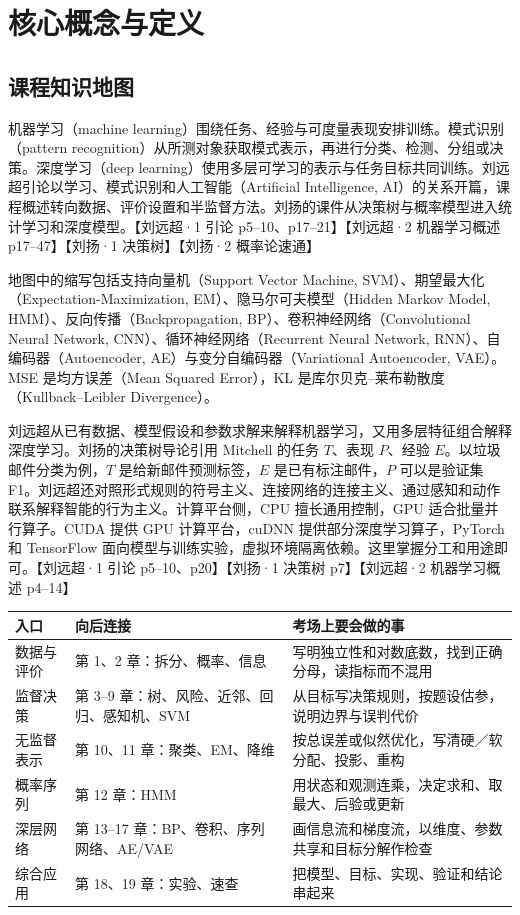 \documentclass[UTF8,a4paper,zihao=-4,fontset=fandol]{ctexrep}
\begin{document}
\section{核心概念与定义}
\subsection{课程知识地图}
机器学习（machine learning）围绕任务、经验与可度量表现安排训练。模式识别（pattern recognition）从所测对象获取模式表示，再进行分类、检测、分组或决策。深度学习（deep learning）使用多层可学习的表示与任务目标共同训练。刘远超引论以学习、模式识别和人工智能（Artificial Intelligence, AI）的关系开篇，课程概述转向数据、评价设置和半监督方法。刘扬的课件从决策树与概率模型进入统计学习和深度模型。【刘远超·1 引论 p5–10、p17–21】【刘远超·2 机器学习概述 p17–47】【刘扬·1 决策树】【刘扬·2 概率论速通】

地图中的缩写包括支持向量机（Support Vector Machine, SVM）、期望最大化（Expectation-Maximization, EM）、隐马尔可夫模型（Hidden Markov Model, HMM）、反向传播（Backpropagation, BP）、卷积神经网络（Convolutional Neural Network, CNN）、循环神经网络（Recurrent Neural Network, RNN）、自编码器（Autoencoder, AE）与变分自编码器（Variational Autoencoder, VAE）。MSE 是均方误差（Mean Squared Error），KL 是库尔贝克–莱布勒散度（Kullback–Leibler Divergence）。

刘远超从已有数据、模型假设和参数求解来解释机器学习，又用多层特征组合解释深度学习。刘扬的决策树导论引用 Mitchell 的任务 $T$、表现 $P$、经验 $E$。以垃圾邮件分类为例，$T$ 是给新邮件预测标签，$E$ 是已有标注邮件，$P$ 可以是验证集 F1。刘远超还对照形式规则的符号主义、连接网络的连接主义、通过感知和动作联系解释智能的行为主义。计算平台侧，CPU 擅长通用控制，GPU 适合批量并行算子。CUDA 提供 GPU 计算平台，cuDNN 提供部分深度学习算子，PyTorch 和 TensorFlow 面向模型与训练实验，虚拟环境隔离依赖。这里掌握分工和用途即可。【刘远超·1 引论 p5–10、p20】【刘扬·1 决策树 p7】【刘远超·2 机器学习概述 p4–14】

\begin{tabularx}{\linewidth}{@{}p{.20\linewidth}XX@{}}
\toprule
入口 & 向后连接 & 考场上要会做的事\\
\midrule
数据与评价 & 第 1、2 章：拆分、概率、信息 & 写明独立性和对数底数，找到正确分母，读指标而不混用\\
监督决策 & 第 3–9 章：树、风险、近邻、回归、感知机、SVM & 从目标写决策规则，按题设估参，说明边界与误判代价\\
无监督表示 & 第 10、11 章：聚类、EM、降维 & 按总误差或似然优化，写清硬／软分配、投影、重构\\
概率序列 & 第 12 章：HMM & 用状态和观测连乘，决定求和、取最大、后验或更新\\
深层网络 & 第 13–17 章：BP、卷积、序列网络、AE/VAE & 画信息流和梯度流，以维度、参数共享和目标分解作检查\\
综合应用 & 第 18、19 章：实验、速查 & 把模型、目标、实现、验证和结论串起来\\
\bottomrule
\end{tabularx}
\end{document}
